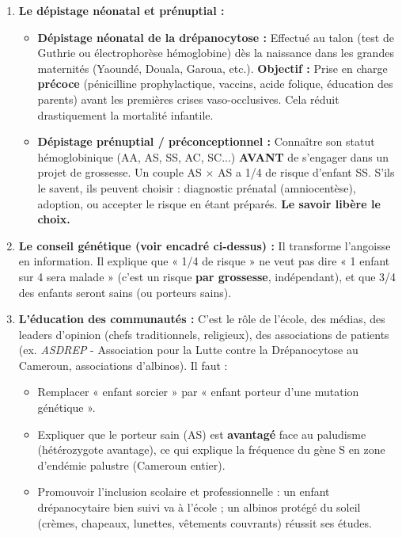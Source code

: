 \documentclass[11pt]{article}
\begin{document}
\begin{enumerate}
    \item \textbf{Le dépistage néonatal et prénuptial :}
    \begin{itemize}
        \item \textbf{Dépistage néonatal de la drépanocytose :} Effectué au talon (test de Guthrie ou électrophorèse hémoglobine) dès la naissance dans les grandes maternités (Yaoundé, Douala, Garoua, etc.). \textbf{Objectif :} Prise en charge \textbf{précoce} (pénicilline prophylactique, vaccins, acide folique, éducation des parents) avant les premières crises vaso-occlusives. Cela réduit drastiquement la mortalité infantile.
        \item \textbf{Dépistage prénuptial / préconceptionnel :} Connaître son statut hémoglobinique (AA, AS, SS, AC, SC...) \textbf{AVANT} de s'engager dans un projet de grossesse. Un couple AS $\times$ AS a 1/4 de risque d'enfant SS. S'ils le savent, ils peuvent choisir : diagnostic prénatal (amniocentèse), adoption, ou accepter le risque en étant préparés. \textbf{Le savoir libère le choix.}
    \end{itemize}
    \item \textbf{Le conseil génétique (voir encadré ci-dessus) :} Il transforme l'angoisse en information. Il explique que « 1/4 de risque » ne veut pas dire « 1 enfant sur 4 sera malade » (c'est un risque \textbf{par grossesse}, indépendant), et que 3/4 des enfants seront sains (ou porteurs sains).
    \item \textbf{L'éducation des communautés :} C'est le rôle de l'école, des médias, des leaders d'opinion (chefs traditionnels, religieux), des associations de patients (ex. \emph{ASDREP} - Association pour la Lutte contre la Drépanocytose au Cameroun, associations d'albinos). Il faut :
    \begin{itemize}
        \item Remplacer « enfant sorcier » par « enfant porteur d'une mutation génétique ».
        \item Expliquer que le porteur sain (AS) est \textbf{avantagé} face au paludisme (hétérozygote avantage), ce qui explique la fréquence du gène S en zone d'endémie palustre (Cameroun entier).
        \item Promouvoir l'inclusion scolaire et professionnelle : un enfant drépanocytaire bien suivi va à l'école ; un albinos protégé du soleil (crèmes, chapeaux, lunettes, vêtements couvrants) réussit ses études.
    \end{itemize}
\end{enumerate}
\end{document}
